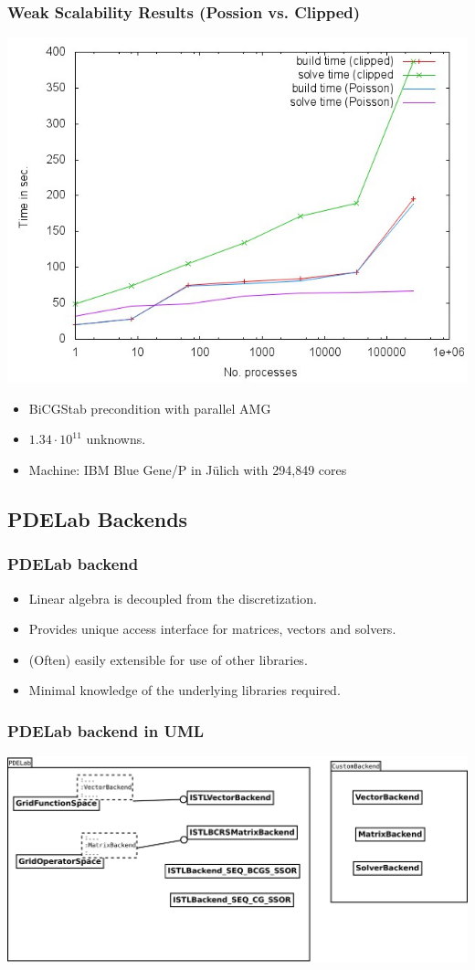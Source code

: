\begin{frame}[fragile]
  \frametitle{Weak Scalability Results (Possion vs. Clipped)}
  \begin{center}
      \includegraphics[width=.6\textwidth]{EPS/solve_build}
  \end{center}
  \begin{itemize}
  \item BiCGStab precondition with parallel AMG
  \item $1.34\cdot 10^{11}$ unknowns.
  \item Machine: IBM Blue Gene/P in J\"ulich with 294,849 cores
  \end{itemize}
\end{frame}
\subsection{PDELab Backends}
\label{sec:pdelab-backends-1}


\begin{frame}
  \frametitle<presentation>{PDELab backend}
  \begin{itemize}
  \item Linear algebra is decoupled from the discretization.
  \item Provides unique access interface for matrices, vectors and
    solvers.
  \item (Often) easily extensible for use of other libraries.
  \item Minimal knowledge of the underlying libraries required.
  \end{itemize}
\end{frame}

\begin{frame}
  \frametitle{PDELab backend in UML}
  \includegraphics[width=\textwidth]{./EPS/backend}
\end{frame}


